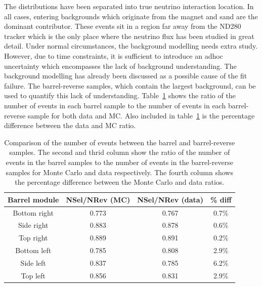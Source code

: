 The distributions have been separated into true neutrino interaction location.  In all cases, entering backgrounds which originate from the magnet and sand are the dominant contributor.  These events sit in a region far away from the ND280 tracker which is the only place where the neutrino flux has been studied in great detail. 
\newline
\newline
Under normal circumstances, the background modelling needs extra study.  However, due to time constraints, it is sufficient to introduce an adhoc uncertainty which encompasses the lack of background understanding.  The background modelling has already been discussed as a possible cause of the fit failure.  The barrel-reverse samples, which contain the largest background, can be used to quantify this lack of understanding.  Table~\ref{table:NSelToNRevRatio} shows the ratio of the number of events in each barrel sample to the number of events in each barrel-reverse sample for both data and MC.  Also included in table~\ref{table:NSelToNRevRatio} is the percentage difference between the data and MC ratio.
\begin{table}
  \begin{tabular}{c c c c }
    Barrel module & NSel/NRev (MC) & NSel/NRev (data) & \% diff \\ \hline \hline
    Bottom right & 0.773 & 0.767 & 0.7\% \\
    Side right & 0.883 & 0.878 & 0.6\% \\
    Top right & 0.889 & 0.891 & 0.2\% \\
    Bottom left & 0.785 & 0.808 & 2.9\% \\
    Side left & 0.837 & 0.785 & 6.2\% \\
    Top left & 0.856 & 0.831 & 2.9\% \\
  \end{tabular}
  \caption{Comparison of the number of events between the barrel and barrel-reverse samples.  The second and thrid column show the ratio of the number of events in the barrel samples to the number of events in the barrel-reverse samples for Monte Carlo and data respectively.  The fourth column shows the percentage difference between the Monte Carlo and data ratios.}
  \label{table:NSelToNRevRatio}
\end{table}
